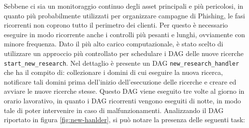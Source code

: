 Sebbene ci sia un monitoraggio continuo degli asset principali e più pericolosi,
in quanto più probabilmente utilizzati per organizzare campagne di Phishing, le fasi
ricorrenti non coprono tutto il perimetro dei clienti. Per questo è necessario
eseguire in modo ricorrente anche i controlli più pesanti e lunghi, ovviamente con
minore frequenza. Dato il più alto carico computazionale, è stato scelto di utilizzare
un approccio più controllato per schedulare i DAG delle nuove ricerche \texttt{start\_new\_research}.
Nel dettaglio è presente un DAG \texttt{new\_research\_handler} che ha il
compito di: collezionare i domini di cui eseguire la nuova ricerca, notificare
tali domini prima dell'inizio dell'esecuzione delle ricerche e creare ed avviare
le nuove ricerche stesse. Questo DAG viene eseguito tre volte al giorno in orario
lavorativo, in quanto i DAG ricorrenti vengono eseguiti di notte, in modo tale di
poter intervenire in caso di malfunzionamenti. Analizzando il DAG riportato in
figura \ref{fig:new-hanlder}, si può notare la presenza delle seguenti task:

